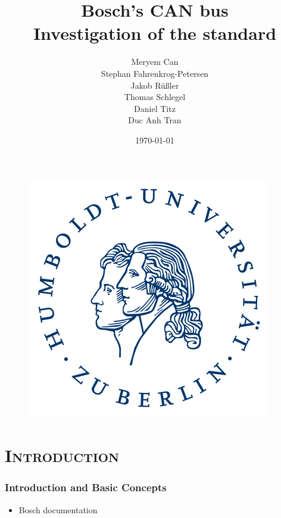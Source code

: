 \documentclass[xcolor=x11names,compress]{beamer}
\renewcommand{\(}{\begin{columns}}
\renewcommand{\)}{\end{columns}}
\newcommand{\<}[1]{\begin{column}{#1}}
\renewcommand{\>}{\end{column}}
\begin{document}
\begin{frame}[plain]
  \begin{figure}
    \flushright
      \includegraphics[scale=0.12]{hu_logo}
    \vspace*{-0.4cm}
  \end{figure}

  \title{\textbf{Bosch's CAN bus\\Investigation of the standard}\\\vspace{0.2cm}}

  \author{Meryem Can\\Stephan Fahrenkrog-Petersen\\Jakob Rüßler\\Thomas Schlegel\\
  Daniel Titz\\Duc Anh Tran\\\vspace{0.3cm}}


\date{\today}
\titlepage
\end{frame}


\section{\scshape Introduction}
\begin{frame}
  \frametitle{Introduction and Basic Concepts}
  \begin{itemize}
      \item Bosch documentation~\cite{can}
  \end{itemize}

\end{frame}
\end{document}
